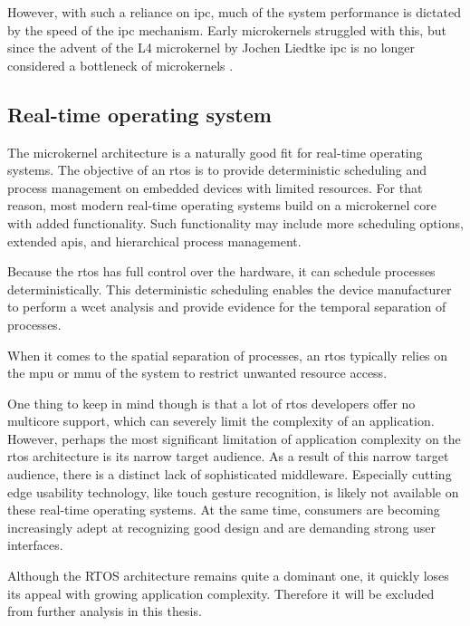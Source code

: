 However, with such a reliance on \acrlong{ipc}, much of the system performance is dictated by the speed of the \acrshort{ipc} mechanism. Early microkernels struggled with this, but since the advent of the L4 microkernel by Jochen Liedtke \acrshort{ipc} is no longer considered a bottleneck of microkernels \cite{liedtke1995micro}\cite{liedtke1996toward}.

\subsection{Real-time operating system} \label{rtos}
The microkernel architecture is a naturally good fit for real-time operating systems. The objective of an \acrshort{rtos} is to provide deterministic scheduling and process management on embedded devices with limited resources. For that reason, most modern real-time operating systems build on a microkernel core with added functionality. Such functionality may include more scheduling options, extended \acrshort{api}s, and hierarchical process management.

Because the \acrshort{rtos} has full control over the hardware, it can schedule processes deterministically. This deterministic scheduling enables the device manufacturer to perform a \acrlong{wcet} analysis and provide evidence for the temporal separation of processes. 

When it comes to the spatial separation of processes, an \acrshort{rtos} typically relies on the \acrshort{mpu} or \acrshort{mmu} of the system to restrict unwanted resource access.


One thing to keep in mind though is that a lot of \acrshort{rtos} developers offer no multicore support, which can severely limit the complexity of an application. However, perhaps the most significant limitation of application complexity on the \acrshort{rtos} architecture is its narrow target audience. As a result of this narrow target audience, there is a distinct lack of sophisticated middleware. Especially cutting edge usability technology, like touch gesture recognition, is likely not available on these real-time operating systems. At the same time, consumers are becoming increasingly adept at recognizing good design and are demanding strong user interfaces.

Although the RTOS architecture remains quite a dominant one, it quickly loses its appeal with growing application complexity. Therefore it will be excluded from further analysis in this thesis.
